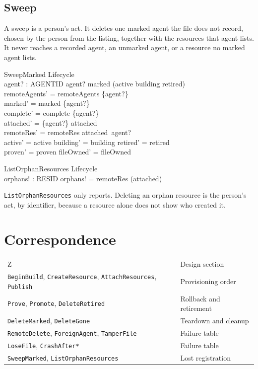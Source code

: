 \documentclass[a4paper,10pt,fleqn]{article}
\begin{document}
\subsection{Sweep}

A sweep is a person's act. It deletes one marked agent the file does not
record, chosen by the person from the listing, together with the resources
that agent lists. It never reaches a recorded agent, an unmarked agent, or a
resource no marked agent lists.

\begin{schema}{SweepMarked}
  \Delta Lifecycle \\
  agent? : AGENTID
\where
  agent? \in marked \setminus (active \cup building \cup retired) \\
  remoteAgents' = remoteAgents \setminus \{agent?\} \\
  marked' = marked \setminus \{agent?\} \\
  complete' = complete \setminus \{agent?\} \\
  attached' = \{agent?\} \ndres attached \\
  remoteRes' = remoteRes \setminus attached~agent? \\
  active' = active \land building' = building \land retired' = retired \\
  proven' = proven \land fileOwned' = fileOwned
\end{schema}

\begin{schema}{ListOrphanResources}
  \Xi Lifecycle \\
  orphans! : \power RESID
\where
  orphans! = remoteRes \setminus \bigcup (\ran attached)
\end{schema}

\texttt{ListOrphanResources} only reports. Deleting an orphan resource is the
person's act, by identifier, because a resource alone does not show who
created it.

\section{Correspondence}

\begin{tabular}{ll}
Z & Design section \\
\texttt{BeginBuild}, \texttt{CreateResource}, \texttt{AttachResources}, \texttt{Publish} & Provisioning order \\
\texttt{Prove}, \texttt{Promote}, \texttt{DeleteRetired} & Rollback and retirement \\
\texttt{DeleteMarked}, \texttt{DeleteGone} & Teardown and cleanup \\
\texttt{RemoteDelete}, \texttt{ForeignAgent}, \texttt{TamperFile} & Failure table \\
\texttt{LoseFile}, \texttt{CrashAfter*} & Failure table \\
\texttt{SweepMarked}, \texttt{ListOrphanResources} & Lost registration \\
\end{tabular}
\end{document}
